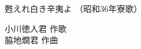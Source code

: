 \documentclass[10pt,b5j]{tarticle} %
\begin{document}
\begin{minipage}[c]{0.7\hsize} %
    \begin{center}
        {\LARGE
            甦えれ白き辛夷よ %
        }
        {\small 
            （昭和36年寮歌） %
        }
    \end{center}
\end{minipage}
\begin{minipage}[c]{0.3\hsize} %
    \begin{flushright} %
        小川徳人君 作歌\\脇地燗君 作曲 %
    \end{flushright}
\end{minipage}
\end{document}
